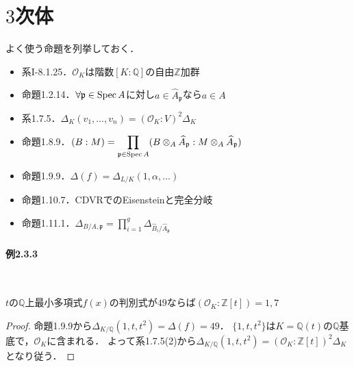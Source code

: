 \section{$3$次体}
よく使う命題を列挙しておく．
\begin{itemize}
  \item 系I-8.1.25．$\mathcal{O}_K$は階数$[K:\mathbb{Q}]$の自由$\mathbb{Z}$加群
  \item 命題1.2.14．$\forall\mathfrak{p} \in \operatorname{Spec} A$に対し$a \in \widehat{A}_\mathfrak{p}$なら$a \in A$
  \item 系1.7.5．$\varDelta_K(v_1, \ldots, v_n) = (\mathcal{O}_K:V)^2 \varDelta_K$
  \item 命題1.8.9．$\displaystyle(B:M) = \prod_{\mathfrak{p} \in \operatorname{Spec} A} (B \otimes_A \widehat{A}_\mathfrak{p}:M \otimes_A \widehat{A}_\mathfrak{p})$
  \item 命題1.9.9．$\varDelta(f) = \varDelta_{L/K}(1, \alpha, \ldots)$
  \item 命題1.10.7．CDVRでのEisensteinと完全分岐
  \item 命題1.11.1．$\varDelta_{B/A, \mathfrak{p}} = \displaystyle \prod_{i=1}^g \varDelta_{\widehat{B}_i/\widehat{A}_\mathfrak{p}}$
\end{itemize}

\paragraph{例2.3.3}~
\begin{screen}
  $t$の$\mathbb{Q}$上最小多項式$f(x)$の判別式が$49$ならば$(\mathcal{O}_K:\mathbb{Z}[t])=1, 7$
\end{screen}
\begin{proof}
  命題1.9.9から$\varDelta_{K/\mathbb{Q}}(1, t, t^2)=\varDelta(f)=49$．
  $\{1, t, t^2\}$は$K=\mathbb{Q}(t)$の$\mathbb{Q}$基底で，$\mathcal{O}_K$に含まれる．
  よって系1.7.5(2)から$\varDelta_{K/\mathbb{Q}}(1, t, t^2)=(\mathcal{O}_K:\mathbb{Z}[t])^2\varDelta_K$となり従う．
\end{proof}

